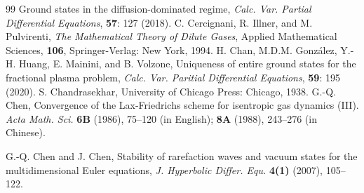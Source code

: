 \documentclass[reqno,11pt]{amsart}
\numberwithin{equation}{section}
\theoremstyle{definition}
\begin{document}
\begin{thebibliography}{99}
 Ground states in the diffusion-dominated regime, {\em Calc. Var. Partial Differential Equations}, 
 {\bf 57}: 127 (2018).
C. Cercignani, R. Illner, and M. Pulvirenti, 
{\em The Mathematical Theory of Dilute Gases}, 
Applied Mathematical Sciences, {\bf 106}, Springer-Verlag: New York, 1994.
H. Chan, M.D.M. Gonz\'alez, Y.-H. Huang, E. Mainini, and B. Volzone, 
Uniqueness of entire ground states for the fractional plasma problem, 
{\em  Calc. Var. Paritial Differential Equations}, {\bf 59}: 195 (2020).
 S. Chandrasekhar,  
 University of Chicago Press: Chicago, 1938.
G.-Q. Chen, Convergence of the Lax-Friedrichs scheme
for isentropic gas dynamics (III).
{\it Acta Math. Sci.} {\bf 6B} (1986), 75--120 (in English);
{\bf 8A} (1988), 243--276 (in Chinese).

G.-Q. Chen and J. Chen,
Stability of rarefaction waves and vacuum states for the multidimensional Euler equations,
{\em J. Hyperbolic Differ. Equ.} {\bf 4(1)} (2007), 105--122.
	


\end{thebibliography}
\end{document}
